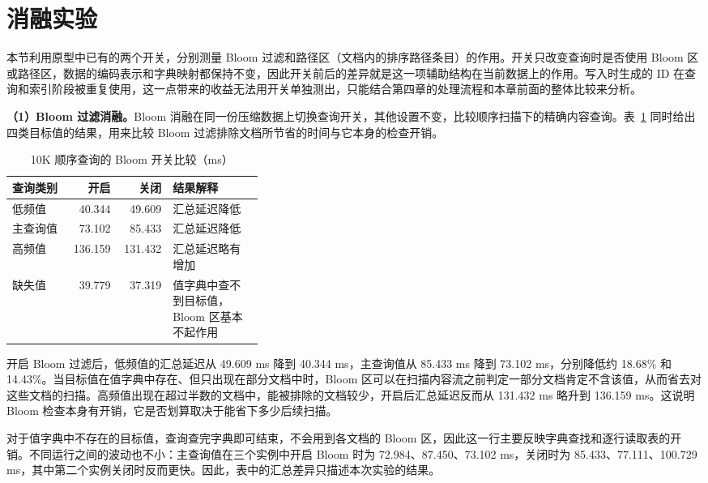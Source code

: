\section{消融实验}

本节利用原型中已有的两个开关，分别测量 Bloom 过滤和路径区（文档内的排序路径条目）的作用。开关只改变查询时是否使用 Bloom 区或路径区，数据的编码表示和字典映射都保持不变，因此开关前后的差异就是这一项辅助结构在当前数据上的作用。写入时生成的 ID 在查询和索引阶段被重复使用，这一点带来的收益无法用开关单独测出，只能结合第四章的处理流程和本章前面的整体比较来分析。

\textbf{（1）Bloom 过滤消融。}Bloom 消融在同一份压缩数据上切换查询开关，其他设置不变，比较顺序扫描下的精确内容查询。表~\ref{tab:exp-bloom-ablation} 同时给出四类目标值的结果，用来比较 Bloom 过滤排除文档所节省的时间与它本身的检查开销。
\begin{table}[htbp]
\centering\small
\caption{10K 顺序查询的 Bloom 开关比较（ms）}
\label{tab:exp-bloom-ablation}
\begin{tabular}{lrrp{0.36\linewidth}}
\toprule
查询类别 & 开启 & 关闭 & 结果解释 \\
\midrule
低频值 & 40.344 & 49.609 & 汇总延迟降低 \\
主查询值 & 73.102 & 85.433 & 汇总延迟降低 \\
高频值 & 136.159 & 131.432 & 汇总延迟略有增加 \\
缺失值 & 39.779 & 37.319 & 值字典中查不到目标值，Bloom 区基本不起作用 \\
\bottomrule
\end{tabular}
\end{table}

开启 Bloom 过滤后，低频值的汇总延迟从 49.609 ms 降到 40.344 ms，主查询值从 85.433 ms 降到 73.102 ms，分别降低约 18.68\% 和 14.43\%。当目标值在值字典中存在、但只出现在部分文档中时，Bloom 区可以在扫描内容流之前判定一部分文档肯定不含该值，从而省去对这些文档的扫描。高频值出现在超过半数的文档中，能被排除的文档较少，开启后汇总延迟反而从 131.432 ms 略升到 136.159 ms。这说明 Bloom 检查本身有开销，它是否划算取决于能省下多少后续扫描。

对于值字典中不存在的目标值，查询查完字典即可结束，不会用到各文档的 Bloom 区，因此这一行主要反映字典查找和逐行读取表的开销。不同运行之间的波动也不小：主查询值在三个实例中开启 Bloom 时为 72.984、87.450、73.102 ms，关闭时为 85.433、77.111、100.729 ms，其中第二个实例关闭时反而更快。因此，表中的汇总差异只描述本次实验的结果。

